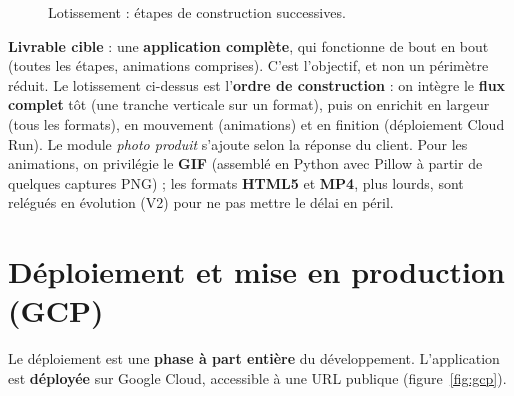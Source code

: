 \documentclass[11pt,a4paper]{article}
\begin{document}
\begin{figure}[h]
\centering
{}
\caption{Lotissement : étapes de construction successives.}
\label{fig:plan}
\end{figure}

\textbf{Livrable cible} : une \textbf{application complète}, qui fonctionne de bout
en bout (toutes les étapes, animations comprises). C'est l'objectif, et non un
périmètre réduit. Le lotissement ci-dessus est l'\textbf{ordre de construction} :
on intègre le \textbf{flux complet} tôt (une tranche verticale sur un format),
puis on enrichit en largeur (tous les formats), en mouvement (animations) et en
finition (déploiement Cloud Run). Le module \emph{photo produit} s'ajoute selon la
réponse du client. Pour les animations, on privilégie le \textbf{GIF} (assemblé en
Python avec Pillow à partir de quelques captures PNG) ; les formats \textbf{HTML5}
et \textbf{MP4}, plus lourds, sont relégués en évolution (V2) pour ne pas mettre le
délai en péril.

\section{Déploiement et mise en production (GCP)}
Le déploiement est une \textbf{phase à part entière} du développement. L'application est
\textbf{déployée} sur Google Cloud, accessible à une URL publique (figure~\ref{fig:gcp}).
\end{document}
